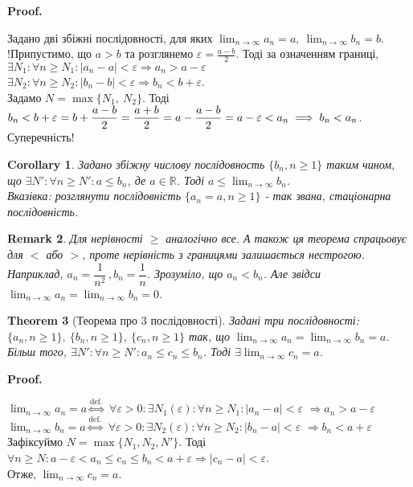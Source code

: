 \documentclass[a4paper, 14pt]{article}
\makeatletter
\def\qed{$\blacksquare$}
\theoremstyle{theoremdd}
\newtheorem{theorem}{Theorem}[subsection]
\theoremstyle{theoremdd}
\theoremstyle{theoremdd}
\theoremstyle{theoremdd}
\theoremstyle{theoremdd}
\theoremstyle{theoremdd}
\newtheorem{remark}[theorem]{Remark}
\theoremstyle{theoremdd}
\theoremstyle{theoremdd}
\newtheorem{corollary}[theorem]{Corollary}
\renewenvironment{proof}[1][Proof.\\]{\par
\pushQED{\hfill \qed}%
\normalfont \topsep6\p@\@plus6\p@\relax
\trivlist
\item\relax
{\bfseries
#1\@addpunct{.}}\hspace\labelsep\ignorespaces
}{%
\popQED\endtrivlist\@endpefalse
}
\makeatother
\begin{document}
	\begin{proof}
	Задано дві збіжні послідовності, для яких $\displaystyle \lim_{n \to \infty} a_n =a, \ \lim_{n \to \infty} b_n = b$.\\
	!Припустимо, що $a>b$ та розглянемо $\displaystyle \varepsilon = \frac{a-b}{2}$. Тоді за означенням границі,\\
	$\exists N_1: \forall n \geq N_1:|a_n-a|<\varepsilon \Rightarrow a_n>a-\varepsilon$\\
	$\exists N_2: \forall n \geq N_2:|b_n-b|<\varepsilon \Rightarrow b_n<b+\varepsilon$.\\
	Задамо $N=\max \{N_1, \ N_2\}$. Тоді  $\displaystyle b_n < b+\varepsilon = b + \frac{a-b}{2}=\frac{a+b}{2}=a-\frac{a-b}{2} = a-\varepsilon<a_n \\ \implies b_n<a_n$. Суперечність!
	\end{proof}
	
	\begin{corollary}
	Задано збіжну числову послідовность $\{b_n, n \geq 1\}$ таким чином, що $\exists N': \forall n \geq N': a \leq b_n$, де $a \in \mathbb{R}$. Тоді $\displaystyle a \leq \lim_{n \to \infty} b_n$.\\
	\textit{Вказівка: розглянути послідовність $\{a_n = a, n \geq 1\}$ - так звана, стаціонарна послідовність.}
	\end{corollary}
	
	\begin{remark}
	Для нерівності $\geq$ аналогічно все. А також ця теорема спрацьовує для $<$ або $>$, проте нерівність з границями залишається нестрогою.\\
	Наприклад, $a_n = \dfrac{1}{n^2} \,, b_n = \dfrac{1}{n}$. Зрозуміло, що $a_n < b_n$. Але звідси $\displaystyle\lim_{n \to \infty} a_n = \displaystyle\lim_{n \to \infty} b_n = 0$.
	\end{remark}
	
	\begin{theorem}[Теорема про 3 послідовності]
	Задані три послідовності: $\{a_n, n \geq 1\}, \ \{b_n, n \geq 1\}, \ \{c_n, n \geq 1\}$ так, що $\displaystyle \lim_{n \to \infty} a_n = \displaystyle \lim_{n \to \infty} b_n = a$. Більш того, $\exists N': \forall n \geq N': a_n \leq c_n \leq b_n$.
	Тоді $\exists \displaystyle \lim_{n \to \infty} c_n = a$.
	\end{theorem}
	
	\begin{proof}
	$\displaystyle \lim_{n \to \infty} a_n = a \overset{\textrm{def.}}{\iff}$ $\forall \varepsilon > 0: \exists N_1(\varepsilon): \forall n \geq N_1: |a_n-a| < \varepsilon$ $\Rightarrow a_n > a - \varepsilon$\\
	$\displaystyle \lim_{n \to \infty} b_n = a \overset{\textrm{def.}}{\iff}$ $\forall \varepsilon > 0: \exists N_2(\varepsilon): \forall n \geq N_2: |b_n-a| < \varepsilon$ $\Rightarrow b_n<a+\varepsilon$\\
	Зафіксуймо $N=\max\{N_1, N_2, N'\}$. Тоді $\forall n \geq N: a-\varepsilon< a_n \leq c_n \leq b_n < a+\varepsilon \Rightarrow |c_n - a|<\varepsilon$.\\
	Отже, $\displaystyle \lim_{n \to \infty} c_n = a$.
	\end{proof}
	
\end{document}
